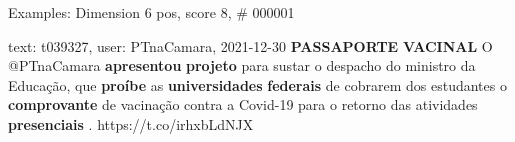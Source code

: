 \begin{frame}{Examples: Dimension 6 pos, score 8, \# 000001}
\footnotesize
\begin{exampleblock}{text: t039327, user: PTnaCamara, 2021-12-30}
\textbf{PASSAPORTE} \textbf{VACINAL} O @PTnaCamara \textbf{apresentou} 
\textbf{projeto} para sustar o despacho do ministro da Educação, que 
\textbf{proíbe} as \textbf{universidades} \textbf{federais} de cobrarem dos 
estudantes o \textbf{comprovante} de vacinação contra a Covid-19 para o retorno 
das atividades \textbf{presenciais} . https://t.co/irhxbLdNJX 
\end{exampleblock}
\end{frame}
